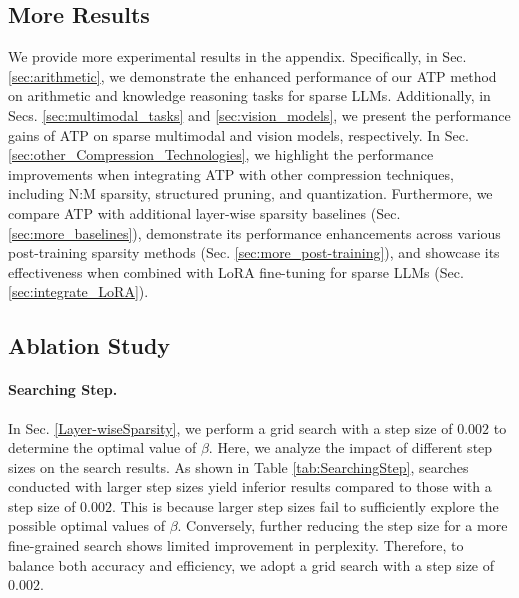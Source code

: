 \subsection{More Results}\label{sec:MoreResults}
We provide more experimental results in the appendix. Specifically, in Sec. \ref{sec:arithmetic}, we demonstrate the enhanced performance of our ATP method on arithmetic and knowledge reasoning tasks for sparse LLMs. Additionally, in Secs. \ref{sec:multimodal_tasks} and \ref{sec:vision_models}, we present the performance gains of ATP on sparse multimodal and vision models, respectively. In Sec. \ref{sec:other_Compression_Technologies}, we highlight the performance improvements when integrating ATP with other compression techniques, including N:M sparsity, structured pruning, and quantization. Furthermore, we compare ATP with additional layer-wise sparsity baselines (Sec. \ref{sec:more_baselines}), demonstrate its performance enhancements across various post-training sparsity methods (Sec. \ref{sec:more_post-training}), and showcase its effectiveness when combined with LoRA fine-tuning for sparse LLMs (Sec. \ref{sec:integrate_LoRA}).

\subsection{Ablation Study}\label{sec:AblationStudy}
\paragraph{Searching Step.}
In Sec. \ref{Layer-wiseSparsity}, we perform a grid search with a step size of $0.002$ to determine the optimal value of $\beta$. Here, we analyze the impact of different step sizes on the search results. As shown in Table \ref{tab:SearchingStep}, searches conducted with larger step sizes yield inferior results compared to those with a step size of $0.002$. This is because larger step sizes fail to sufficiently explore the possible optimal values of $\beta$. Conversely, further reducing the step size for a more fine-grained search shows limited improvement in perplexity. Therefore, to balance both accuracy and efficiency, we adopt a grid search with a step size of $0.002$.
\begin{table}[h!]
    \centering
    \caption{The impact of different step sizes on search results.}\label{tab:SearchingStep}
\end{table}

